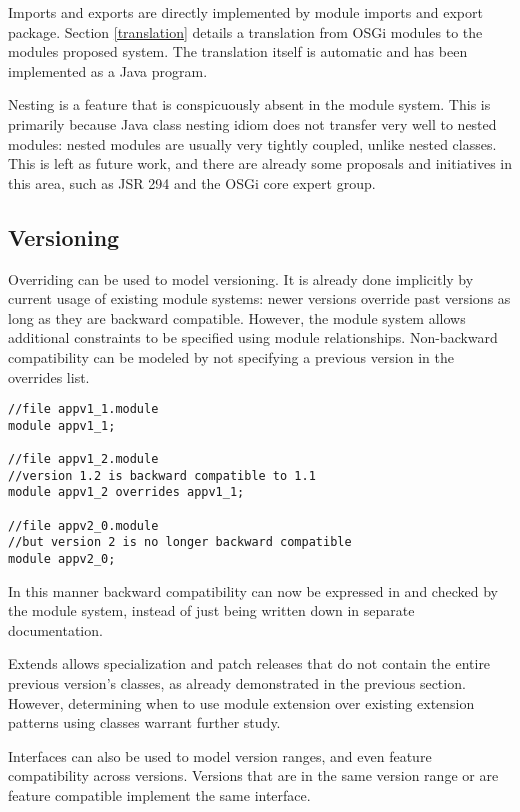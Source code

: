 Imports and exports are directly implemented by module imports and export package.
Section \ref{translation} details a translation from OSGi modules to
the modules proposed system. The translation itself is automatic and has been
implemented as a Java program.

Nesting is a feature that is conspicuously absent in the module system. This
is primarily because Java class nesting idiom does not transfer very well to
nested modules: nested modules are usually very tightly coupled, unlike nested
classes. This is left as future work, and there are already some proposals
and initiatives in this area, such as JSR 294 and the OSGi core expert group.

\subsection{Versioning}

Overriding can be used to model versioning. It is already done
implicitly by current usage of existing module systems: newer versions  
override past versions as long as they are backward compatible.
However, the module system allows additional constraints to be specified using
module relationships. Non-backward compatibility can be modeled by not specifying a
previous version in the overrides list.

\begin{lstlisting}[caption=Versioning Using Overrides]
//file appv1_1.module
module appv1_1;

//file appv1_2.module
//version 1.2 is backward compatible to 1.1
module appv1_2 overrides appv1_1;

//file appv2_0.module
//but version 2 is no longer backward compatible
module appv2_0; 
\end{lstlisting}

In this manner backward compatibility can now be expressed in 
and checked by the module system, instead of just being written
down in separate documentation.

Extends allows specialization and patch releases that do not contain 
the entire previous version's classes, as already demonstrated in
the previous section. However, determining when to use module
extension over existing extension patterns using classes warrant
further study.

Interfaces can also be used to model version ranges, and even feature
compatibility across versions. Versions that are in the same version 
range or are feature compatible implement the same interface.


